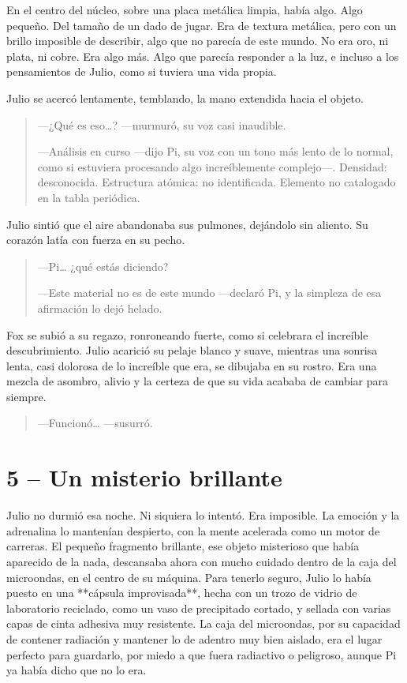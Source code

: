 \documentclass[a4paper,12pt]{book}
\begin{document}
En el centro del núcleo, sobre una placa metálica limpia, había algo. Algo pequeño. Del tamaño de un dado de jugar. Era de textura metálica, pero con un brillo imposible de describir, algo que no parecía de este mundo. No era oro, ni plata, ni cobre. Era algo más. Algo que parecía responder a la luz, e incluso a los pensamientos de Julio, como si tuviera una vida propia.

Julio se acercó lentamente, temblando, la mano extendida hacia el objeto.

\begin{quote}
    —¿Qué es eso…? —murmuró, su voz casi inaudible.

    —Análisis en curso —dijo Pi, su voz con un tono más lento de lo normal, como si estuviera procesando algo increíblemente complejo—. Densidad: desconocida. Estructura atómica: no identificada. Elemento no catalogado en la tabla periódica.
\end{quote}

Julio sintió que el aire abandonaba sus pulmones, dejándolo sin aliento. Su corazón latía con fuerza en su pecho.

\begin{quote}
    —Pi… ¿qué estás diciendo?

    —Este material no es de este mundo —declaró Pi, y la simpleza de esa afirmación lo dejó helado.
\end{quote}

Fox se subió a su regazo, ronroneando fuerte, como si celebrara el increíble descubrimiento. Julio acarició su pelaje blanco y suave, mientras una sonrisa lenta, casi dolorosa de lo increíble que era, se dibujaba en su rostro. Era una mezcla de asombro, alivio y la certeza de que su vida acababa de cambiar para siempre.

\begin{quote}
    —Funcionó… —susurró.
\end{quote}

\cleardoublepage %

\chapter*{5 – Un misterio brillante}

Julio no durmió esa noche. Ni siquiera lo intentó. Era imposible. La emoción y la adrenalina lo mantenían despierto, con la mente acelerada como un motor de carreras. El pequeño fragmento brillante, ese objeto misterioso que había aparecido de la nada, descansaba ahora con mucho cuidado dentro de la caja del microondas, en el centro de su máquina. Para tenerlo seguro, Julio lo había puesto en una **cápsula improvisada**, hecha con un trozo de vidrio de laboratorio reciclado, como un vaso de precipitado cortado, y sellada con varias capas de cinta adhesiva muy resistente. La caja del microondas, por su capacidad de contener radiación y mantener lo de adentro muy bien aislado, era el lugar perfecto para guardarlo, por miedo a que fuera radiactivo o peligroso, aunque Pi ya había dicho que no lo era.
\end{document}
